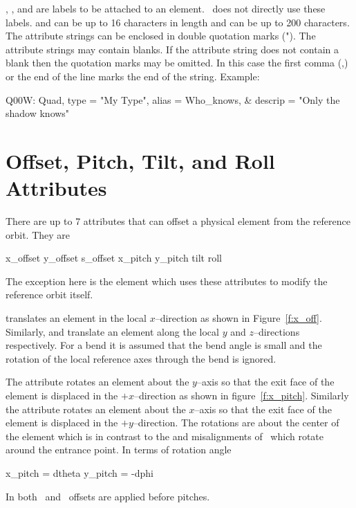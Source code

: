 , , and  are labels to be attached 
to an element. \bmad\ does not directly use these labels. 
and  can be up to 16 characters in length and 
can be up to 200 characters. The attribute strings can be enclosed in
double quotation marks ("). The attribute strings may contain
blanks. If the attribute string does not contain a blank then the
quotation marks may be omitted. In this case the first comma (,) or
the end of the line marks the end of the string. Example:
\begin{example}
  Q00W: Quad, type = "My Type", alias = Who_knows, &
                                  descrip = "Only the shadow knows"
\end{example}

\section{Offset, Pitch, Tilt, and Roll Attributes}
\label{s:offset}

There are up to 7 attributes that can offset a physical element
from the reference orbit. They are
\begin{example}
  x\_offset
  y\_offset
  s\_offset
  x\_pitch
  y\_pitch
  tilt
  roll
\end{example}
The exception here is the  element which uses these
attributes to modify the reference orbit itself.

 translates an element in the local $x$--direction
as shown in Figure~\ref{f:x_off}. Similarly,  and 
 translate an element along the local $y$ and 
$z$--directions respectively. For a bend it is assumed that
the bend angle is small and the rotation of the local reference
axes through the bend is ignored.

The  attribute rotates an element about the $y$--axis
so that the exit face of the element is displaced in the 
$+x$--direction as shown in figure~\ref{f:x_pitch}. Similarly
the  attribute rotates an element about the $x$--axis
so that the exit face of the element is displaced in the 
$+y$--direction. The rotations
are about the center of the element which is in contrast to the 
 and  misalignments of \mad\ which rotate
around the entrance point. In terms of rotation angle
\begin{example}
  x_pitch =  dtheta
  y_pitch = -dphi
\end{example}
In both \bmad\ and \mad\ offsets are applied before pitches.

